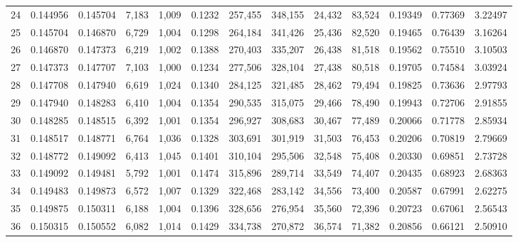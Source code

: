 \begin{tabular}{rrrrrrrrrrrrr}
24  &  0.144956 &  0.145704 &   7,183 &  1,009 &                                     0.1232 &  257,455 &  348,155 &   24,432 &   83,524 &  0.19349 &  0.77369 &  3.22497 \\
25  &  0.145704 &  0.146870 &   6,729 &  1,004 &                                     0.1298 &  264,184 &  341,426 &   25,436 &   82,520 &  0.19465 &  0.76439 &  3.16264 \\
26  &  0.146870 &  0.147373 &   6,219 &  1,002 &                                     0.1388 &  270,403 &  335,207 &   26,438 &   81,518 &  0.19562 &  0.75510 &  3.10503 \\
27  &  0.147373 &  0.147707 &   7,103 &  1,000 &                                     0.1234 &  277,506 &  328,104 &   27,438 &   80,518 &  0.19705 &  0.74584 &  3.03924 \\
28  &  0.147708 &  0.147940 &   6,619 &  1,024 &                                     0.1340 &  284,125 &  321,485 &   28,462 &   79,494 &  0.19825 &  0.73636 &  2.97793 \\
29  &  0.147940 &  0.148283 &   6,410 &  1,004 &                                     0.1354 &  290,535 &  315,075 &   29,466 &   78,490 &  0.19943 &  0.72706 &  2.91855 \\
30  &  0.148285 &  0.148515 &   6,392 &  1,001 &                                     0.1354 &  296,927 &  308,683 &   30,467 &   77,489 &  0.20066 &  0.71778 &  2.85934 \\
31  &  0.148517 &  0.148771 &   6,764 &  1,036 &                                     0.1328 &  303,691 &  301,919 &   31,503 &   76,453 &  0.20206 &  0.70819 &  2.79669 \\
32  &  0.148772 &  0.149092 &   6,413 &  1,045 &                                     0.1401 &  310,104 &  295,506 &   32,548 &   75,408 &  0.20330 &  0.69851 &  2.73728 \\
33  &  0.149092 &  0.149481 &   5,792 &  1,001 &                                     0.1474 &  315,896 &  289,714 &   33,549 &   74,407 &  0.20435 &  0.68923 &  2.68363 \\
34  &  0.149483 &  0.149873 &   6,572 &  1,007 &                                     0.1329 &  322,468 &  283,142 &   34,556 &   73,400 &  0.20587 &  0.67991 &  2.62275 \\
35  &  0.149875 &  0.150311 &   6,188 &  1,004 &                                     0.1396 &  328,656 &  276,954 &   35,560 &   72,396 &  0.20723 &  0.67061 &  2.56543 \\
36  &  0.150315 &  0.150552 &   6,082 &  1,014 &                                     0.1429 &  334,738 &  270,872 &   36,574 &   71,382 &  0.20856 &  0.66121 &  2.50910 \\

\end{tabular}
